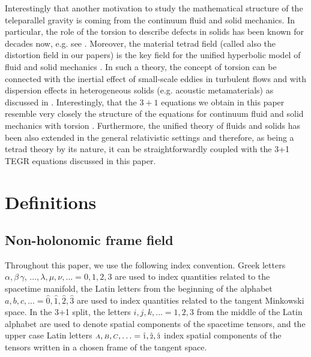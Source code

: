 \documentclass[
10pt, %
a4paper, %
oneside, %
twocolumn,
headinclude,footinclude, %
BCOR5mm, %
]{scrartcl}
\newcommand{\sA}{\mathsmaller A}
\newcommand{\sB}{\mathsmaller B}
\newcommand{\sC}{\mathsmaller C}
\newcommand{\indalg}[1]{\hat{\mathsmaller{#1}}}
\begin{document}
	
	Interestingly that another motivation to study the mathematical structure of
	the teleparallel gravity is coming from the continuum fluid and solid
	mechanics. In particular, the role of the torsion to describe defects in
	solids has been known for decades now, e.g. see
	\cite{VolovichKatanaev1992,Hehl2007,Yavari2012,NguyenLeMarrec2022,Bohmer2020,Lychev2022}.
	Moreover, the material tetrad field (called also the distortion field in our
	papers) is the key field for the unified hyperbolic model of fluid and solid
	mechanics \cite{HPR2016,DPRZ2016}. In such a theory, the concept of torsion
	can be connected with the inertial effect of small-scale eddies in turbulent
	flows and with dispersion effects in heterogeneous solids (e.g. acoustic
	metamaterials) as discussed in \cite{Torsion2019}. Interestingly, that the $
	3+1 $ equations we obtain in this paper resemble very closely the structure
	of the equations for continuum fluid and solid mechanics with torsion
	\cite{Torsion2019}. Furthermore, the unified theory of fluids and solids has
	been also extended in the general relativistic settings \cite{PTRSA2020} and
	therefore, as being a tetrad theory by its nature, it can be
	straightforwardly coupled with the 3+1 TEGR equations discussed in this
	paper.
	
	\section{Definitions}
	
	\subsection{Non-holonomic frame field}
	
	Throughout this paper, we use the following index convention. Greek letters $ \alpha, 
	\beta\,\gamma$, 
	$\ldots, \lambda,\mu,\nu,... 
	=0,1,2,3
	$ are used to index quantities related to the spacetime manifold, the Latin letters from the 
	beginning of the alphabet $ a,b,c,... 
	=\hat{0},\hat{1},\hat{2},\hat{3}$ are used to index quantities related to the tangent Minkowski 
	space.
	In the 3+1 split, the letters $ i,j,k,\ldots =1,2,3$ from the middle of the Latin alphabet 
	are 
	used 
	to denote spatial components of the spacetime tensors, and the upper case Latin letters $ 
	\sA,\sB,\sC,\ldots=\indalg{1},\indalg{2},\indalg{3} $ index spatial components of the tensors 
	written in a chosen frame of the 
	tangent space.
	
	
	
\end{document}
